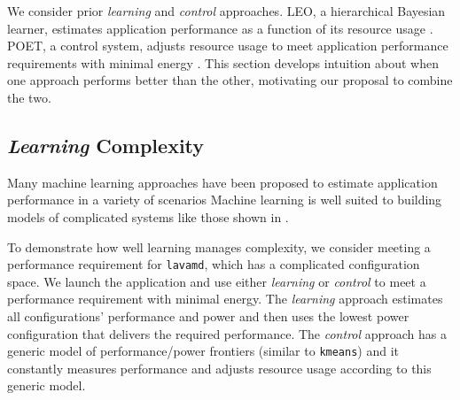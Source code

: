 
We consider prior \emph{learning} and \emph{control} approaches.  LEO,
a hierarchical Bayesian learner, estimates application performance as
a function of its resource usage \cite{LEO}. POET, a control system,
adjusts resource usage to meet application performance requirements
with minimal energy \cite{POET}.  This section develops intuition
about when one approach performs better than the other, motivating our
proposal to combine the two.

\subsection{\emph{Learning} Complexity}
Many machine learning approaches have been proposed to estimate
application performance in a variety of scenarios
Machine learning is well suited to building models of complicated
systems like those shown in
.

To demonstrate how well learning manages complexity, we consider
meeting a performance requirement for \texttt{lavamd}, which has a
complicated configuration space.  We launch the application and use
either \emph{learning} or \emph{control} to meet a performance
requirement with minimal energy.  The \emph{learning} approach
estimates all configurations' performance and power and then uses the
lowest power configuration that delivers the required performance.
The \emph{control} approach has a generic model of performance/power
frontiers (similar to \texttt{kmeans}) and it constantly measures
performance and adjusts resource usage according to this generic
model.  

